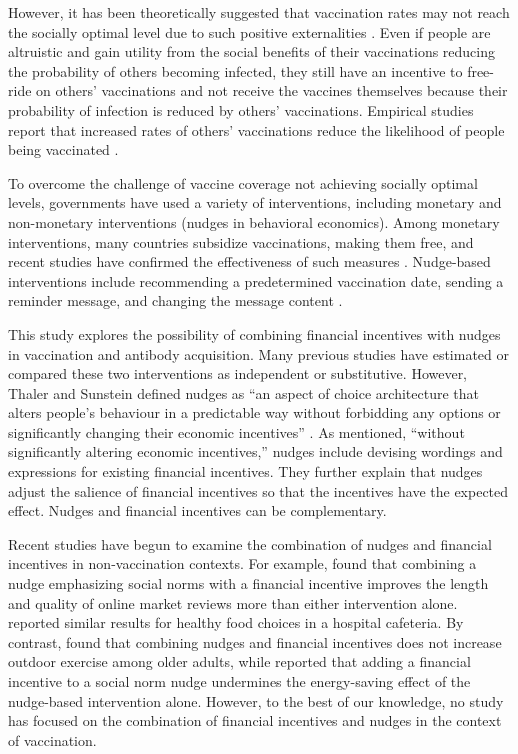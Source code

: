 \documentclass[
  11pt,
  a4paper
]{article}
\begin{document}
However, it has been theoretically suggested that vaccination rates may not reach the socially optimal level due to such positive externalities \citep{Brito1991a, Francis1997, Stiglitz2000}. Even if people are altruistic and gain utility from the social benefits of their vaccinations reducing the probability of others becoming infected, they still have an incentive to free-ride on others' vaccinations and not receive the vaccines themselves because their probability of infection is reduced by others' vaccinations. Empirical studies report that increased rates of others' vaccinations reduce the likelihood of people being vaccinated \citep{Hershey1994, Ibuka2014}.

To overcome the challenge of vaccine coverage not achieving socially optimal levels, governments have used a variety of interventions, including monetary and non-monetary interventions (nudges in behavioral economics). Among monetary interventions, many countries subsidize vaccinations, making them free, and recent studies have confirmed the effectiveness of such measures \citep{Barber2022, Brehm2022}. Nudge-based interventions include recommending a predetermined vaccination date, sending a reminder message, and changing the message content \citep{Chapman2010, Sasaki2022, Yokum2018}.

This study explores the possibility of combining financial incentives with nudges in vaccination and antibody acquisition. Many previous studies have estimated or compared these two interventions as independent or substitutive. However, Thaler and Sunstein defined nudges as ``an aspect of choice architecture that alters people's behaviour in a predictable way without forbidding any options or significantly changing their economic incentives'' \citep[p.6]{Thaler2009}. As mentioned, ``without significantly altering economic incentives,'' nudges include devising wordings and expressions for existing financial incentives. They further explain that nudges adjust the salience of financial incentives so that the incentives have the expected effect. Nudges and financial incentives can be complementary.

Recent studies have begun to examine the combination of nudges and financial incentives in non-vaccination contexts. For example, \citet{Burtch2018} found that combining a nudge emphasizing social norms with a financial incentive improves the length and quality of online market reviews more than either intervention alone. \citet{Thorndike2016} reported similar results for healthy food choices in a hospital cafeteria. By contrast, \citet{Kullgren2014} found that combining nudges and financial incentives does not increase outdoor exercise among older adults, while \citet{Pellerano2017} reported that adding a financial incentive to a social norm nudge undermines the energy-saving effect of the nudge-based intervention alone. However, to the best of our knowledge, no study has focused on the combination of financial incentives and nudges in the context of vaccination.
\end{document}
